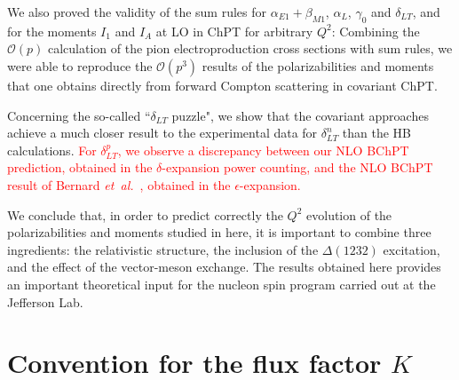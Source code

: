 \documentclass[twocolumn,prc,showpacs,nofootinbib,preprintnumbers,amsmath,amssymb,superscriptaddress]{revtex4-1}
\begin{document}
We also proved the validity of the sum rules for $\alpha_{E1}+\beta_{M1}$, $\alpha_L$, $\gamma_0$ and $\delta_{LT}$, and for the moments $I_1$ and $I_A$ at LO in ChPT for arbitrary $Q^2$:
Combining the $\mathcal{O}(p)$ calculation of the pion electroproduction cross sections with sum rules, we were able to reproduce the $\mathcal{O}(p^3)$ results of the polarizabilities and moments that one obtains directly from forward Compton scattering in covariant ChPT.


Concerning the so-called ``$\delta_{LT}$ puzzle", we show that the covariant approaches achieve a much closer result to the experimental data for $\delta^n_{LT}$ than the HB calculations. \textcolor{red}{For $\delta^p_{LT}$, we observe a discrepancy between our NLO BChPT prediction, obtained in the $\delta$-expansion power counting, and the NLO BChPT result of Bernard {\it et~al.}~\cite{Bernard:2012hb}, obtained in the $\epsilon$-expansion.}

We conclude that, in order to predict correctly the $Q^2$ evolution of the polarizabilities and moments studied in here, it is important to combine three ingredients: the relativistic structure, the inclusion of the $\Delta(1232)$ excitation, and the effect of the vector-meson exchange.
The results obtained here provides an important theoretical input for the nucleon spin program carried out at the Jefferson Lab.



\appendix


\section{Convention for the flux factor $K$} \label{App:FluxFactor}
\end{document}
